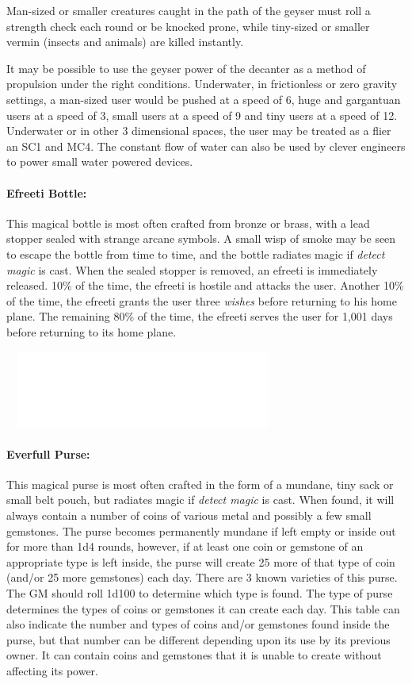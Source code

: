 \begin{multicols}{2}
Man-sized or smaller creatures caught in the path of the geyser must roll a strength check each round or be knocked prone, while tiny-sized or smaller vermin (insects and animals) are killed instantly.

It may be possible to use the geyser power of the decanter as a method of propulsion under the right conditions.  Underwater, in frictionless or zero gravity settings, a man-sized user would be pushed at a speed of 6, huge and gargantuan users at a speed of 3, small users at a speed of 9 and tiny users at a speed of 12.  Underwater or in other 3 dimensional spaces, the user may be treated as a flier an SC1 and MC4.  The constant flow of water can also be used by clever engineers to power small water powered devices.

\paragraph{Efreeti Bottle:} This magical bottle is most often crafted from bronze or brass, with a lead stopper sealed with strange arcane symbols.  A small wisp of smoke may be seen to escape the bottle from time to time, and the bottle radiates magic if \textit{detect magic} is cast.  When the sealed stopper is removed, an efreeti is immediately released.  10\% of the time, the efreeti is hostile and attacks the user.  Another 10\% of the time, the efreeti grants the user three \textit{wishes} before returning to his home plane.  The remaining 80\% of the time, the efreeti serves the user for 1,001 days before returning to its home plane.

\noindent\includegraphics[width=3.6in, height=1in]{testblock.pdf}

\paragraph{Everfull Purse:} This magical purse is most often crafted in the form of a mundane, tiny sack or small belt pouch, but radiates magic if \textit{detect magic} is cast.  When found, it will always contain a number of coins of various metal and possibly a few small gemstones.  The purse becomes permanently mundane if left empty or inside out for more than 1d4 rounds, however, if at least one coin or gemstone of an appropriate type is left inside, the purse will create 25 more of that type of coin (and/or 25 more gemstones) each day.  There are 3 known varieties of this purse.  The GM should roll 1d100 to determine which type is found.  The type of purse determines the types of coins or gemstones it can create each day.  This table can also indicate the number and types of coins and/or gemstones found inside the purse, but that number can be different depending upon its use by its previous owner.  It can contain coins and gemstones that it is unable to create without affecting its power.


\end{multicols}
